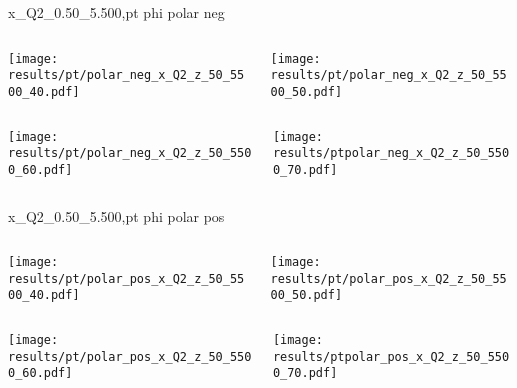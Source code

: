 \begin{frame}{x\_Q2\_0.50\_5.500,pt phi polar neg}
\begin{columns}
\begin{column}[T]{0.5\textwidth}
\texttt{[image: results/pt/polar\_neg\_x\_Q2\_z\_50\_5500\_40.pdf]}
\end{column}
\begin{column}[T]{0.5\textwidth}
\texttt{[image: results/pt/polar\_neg\_x\_Q2\_z\_50\_5500\_50.pdf]}
\end{column}
\end{columns}
\begin{columns}
\begin{column}[T]{0.5\textwidth}
\texttt{[image: results/pt/polar\_neg\_x\_Q2\_z\_50\_5500\_60.pdf]}
\end{column}
\begin{column}[T]{0.5\textwidth}
\texttt{[image: results/ptpolar\_neg\_x\_Q2\_z\_50\_5500\_70.pdf]}
\end{column}
\end{columns}
\end{frame}
\begin{frame}{x\_Q2\_0.50\_5.500,pt phi polar pos}
\begin{columns}
\begin{column}[T]{0.5\textwidth}
\texttt{[image: results/pt/polar\_pos\_x\_Q2\_z\_50\_5500\_40.pdf]}
\end{column}
\begin{column}[T]{0.5\textwidth}
\texttt{[image: results/pt/polar\_pos\_x\_Q2\_z\_50\_5500\_50.pdf]}
\end{column}
\end{columns}
\begin{columns}
\begin{column}[T]{0.5\textwidth}
\texttt{[image: results/pt/polar\_pos\_x\_Q2\_z\_50\_5500\_60.pdf]}
\end{column}
\begin{column}[T]{0.5\textwidth}
\texttt{[image: results/ptpolar\_pos\_x\_Q2\_z\_50\_5500\_70.pdf]}
\end{column}
\end{columns}
\end{frame}
